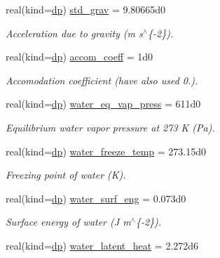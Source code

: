 \begin{DoxyCompactItemize}
real(kind=\mbox{\hyperlink{namespacepmc__constants_a396b7709ed4da67dac74cb46a1466ed6}{dp}}) \mbox{\hyperlink{structpmc__constants_1_1const__t_ae73431b88abb58acae0a1dec5a167a26}{std\+\_\+grav}} = 9.\+80665d0
\begin{DoxyCompactList}\small\item\em Acceleration due to gravity (m s$^\wedge$\{-\/2\}). \end{DoxyCompactList}\item 
real(kind=\mbox{\hyperlink{namespacepmc__constants_a396b7709ed4da67dac74cb46a1466ed6}{dp}}) \mbox{\hyperlink{structpmc__constants_1_1const__t_ad650ce072901e84d9597318dd315ba66}{accom\+\_\+coeff}} = 1d0
\begin{DoxyCompactList}\small\item\em Accomodation coefficient (have also used 0.). \end{DoxyCompactList}\item 
real(kind=\mbox{\hyperlink{namespacepmc__constants_a396b7709ed4da67dac74cb46a1466ed6}{dp}}) \mbox{\hyperlink{structpmc__constants_1_1const__t_a69d16b6e42aeb18bd0319a67de510982}{water\+\_\+eq\+\_\+vap\+\_\+press}} = 611d0
\begin{DoxyCompactList}\small\item\em Equilibrium water vapor pressure at 273 K (Pa). \end{DoxyCompactList}\item 
real(kind=\mbox{\hyperlink{namespacepmc__constants_a396b7709ed4da67dac74cb46a1466ed6}{dp}}) \mbox{\hyperlink{structpmc__constants_1_1const__t_aab10bb281fe8ee00e1189fc26c83a949}{water\+\_\+freeze\+\_\+temp}} = 273.\+15d0
\begin{DoxyCompactList}\small\item\em Freezing point of water (K). \end{DoxyCompactList}\item 
real(kind=\mbox{\hyperlink{namespacepmc__constants_a396b7709ed4da67dac74cb46a1466ed6}{dp}}) \mbox{\hyperlink{structpmc__constants_1_1const__t_a020a8bbab8ccd7c13642b17a774c9e21}{water\+\_\+surf\+\_\+eng}} = 0.\+073d0
\begin{DoxyCompactList}\small\item\em Surface energy of water (J m$^\wedge$\{-\/2\}). \end{DoxyCompactList}\item 
real(kind=\mbox{\hyperlink{namespacepmc__constants_a396b7709ed4da67dac74cb46a1466ed6}{dp}}) \mbox{\hyperlink{structpmc__constants_1_1const__t_adb863b197294a8477f25ebebba108f60}{water\+\_\+latent\+\_\+heat}} = 2.\+272d6

\end{DoxyCompactItemize}
